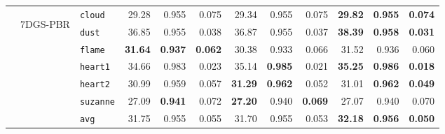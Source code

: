 \begin{table}[bp]
{\begin{tabular}{@{\hskip 2pt}cc|@{\hskip 2pt}l@{\hskip 2pt}|@{\hskip 2pt}r@{\hskip 2pt}r@{\hskip 2pt}r|@{\hskip 2pt}r@{\hskip 2pt}r@{\hskip 2pt}r|@{\hskip 2pt}r@{\hskip 2pt}r@{\hskip 2pt}r@{\hskip 2pt}}


& \multirow{7}{*}{\begin{sideways}7DGS-PBR\end{sideways}}
    & \texttt{cloud}    & 29.28 & 0.955 & 0.075 & 29.34 & 0.955 & 0.075 & \bf 29.82 & \bf 0.955 & \bf 0.074 \\
    & & \texttt{dust}     & 36.85 & 0.955 & 0.038 & 36.87 & 0.955 &  0.037 & \bf 38.39 & \bf 0.958 & \bf 0.031 \\
    & & \texttt{flame}    & \bf 31.64 & \bf 0.937 & \bf 0.062 & 30.38 & 0.933 & 0.066 & 31.52 & 0.936 & 0.060 \\
    & & \texttt{heart1}   & 34.66 & 0.983 & 0.023 & 35.14 & \bf 0.985 & 0.021 &  \bf 35.25 & \bf 0.986 & \bf 0.018 \\
    & & \texttt{heart2}   & 30.99 & 0.959 & 0.057 & \bf 31.29 & \bf 0.962 & 0.052 & 31.01 & \bf 0.962 & \bf 0.049 \\
    & & \texttt{suzanne}  & 27.09 & \bf 0.941 & 0.072 & \bf 27.20 & 0.940 & \bf 0.069 & 27.07 & 0.940 & 0.070 \\
    \cmidrule{3-12}
        & & \texttt{avg}
          & 31.75
          & 0.955
          & 0.055
          & 31.70
          & 0.955
          & 0.053
          & \bf 32.18
          & \bf 0.956
          & \bf 0.050 \\
    \cmidrule{2-12}


\end{tabular}}
\end{table}
